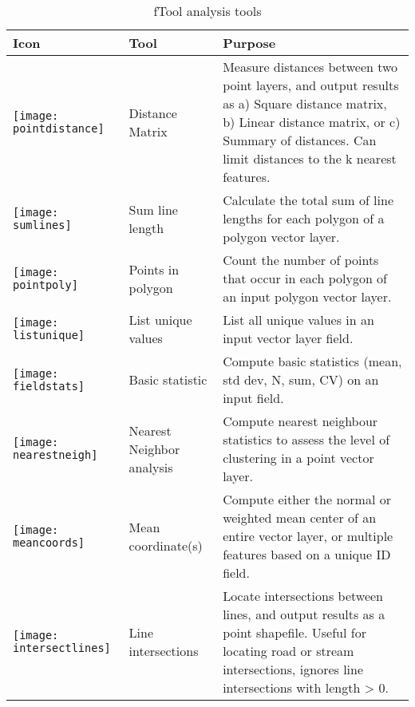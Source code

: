 \begin{table}[ht]
\centering
\caption{fTool analysis tools}\label{tab:ftool_analysis}\medskip
 \begin{tabular}{|p{0.3in}|p{1.2in}|p{4.7in}|}
 \hline \textbf{Icon} & \textbf{Tool} & \textbf{Purpose} \\
 \hline \texttt{[image: pointdistance]} & Distance Matrix &
Measure distances between two point layers, and output results as a) Square
distance matrix, b) Linear distance matrix, or c) Summary of distances. Can
limit distances to the k nearest features. \\ 
 \hline \texttt{[image: sumlines]} & Sum line length & Calculate
the total sum of line lengths for each polygon of a polygon vector layer. \\
 \hline \texttt{[image: pointpoly]} & Points in polygon & Count
the number of points that occur in each polygon of an input polygon vector
layer. \\
 \hline \texttt{[image: listunique]} & List unique values & List
all unique values in an input vector layer field. \\
 \hline \texttt{[image: fieldstats]} & Basic statistic & Compute
basic statistics (mean, std dev, N, sum, CV) on an input field. \\ 
 \hline \texttt{[image: nearestneigh]} & Nearest Neighbor analysis
& Compute nearest neighbour statistics to assess the level of clustering in a
point vector layer. \\
 \hline \texttt{[image: meancoords]} & Mean coordinate(s) &
Compute either the normal or weighted mean center of an entire vector layer,
or multiple features based on a unique ID field. \\ 
 \hline \texttt{[image: intersectlines]} & Line intersections &
Locate intersections between lines, and output results as a point shapefile.
Useful for locating road or stream intersections, ignores line intersections
with length > 0. \\
 \hline
\end{tabular}
\end{table}


